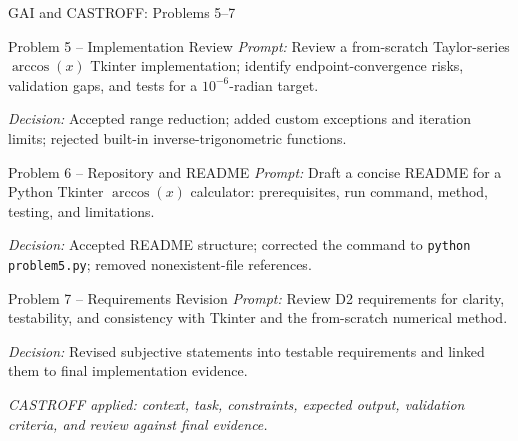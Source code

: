 \documentclass[aspectratio=169]{beamer}
\begin{document}
\begin{frame}[t]{GAI and CASTROFF: Problems 5--7}
\fontsize{7.7pt}{9.0pt}\selectfont
\setlength{\parskip}{0.12em}

\begin{block}{Problem 5 -- Implementation Review}
\textit{Prompt:} Review a from-scratch Taylor-series \(\arccos(x)\) Tkinter
implementation; identify endpoint-convergence risks, validation gaps, and
tests for a \(10^{-6}\)-radian target.

\textit{Decision:} Accepted range reduction; added custom exceptions and
iteration limits; rejected built-in inverse-trigonometric functions.
\end{block}

\vspace{0.05cm}

\begin{block}{Problem 6 -- Repository and README}
\textit{Prompt:} Draft a concise README for a Python Tkinter
\(\arccos(x)\) calculator: prerequisites, run command, method, testing,
and limitations.

\textit{Decision:} Accepted README structure; corrected the command to
\texttt{python problem5.py}; removed nonexistent-file references.
\end{block}

\vspace{0.05cm}

\begin{block}{Problem 7 -- Requirements Revision}
\textit{Prompt:} Review D2 requirements for clarity, testability, and
consistency with Tkinter and the from-scratch numerical method.

\textit{Decision:} Revised subjective statements into testable requirements
and linked them to final implementation evidence.
\end{block}

\vspace{0.06cm}

\centering
\color{midgray}
\textit{CASTROFF applied: context, task, constraints, expected output,
validation criteria, and review against final evidence.}
\end{frame}
\end{document}

